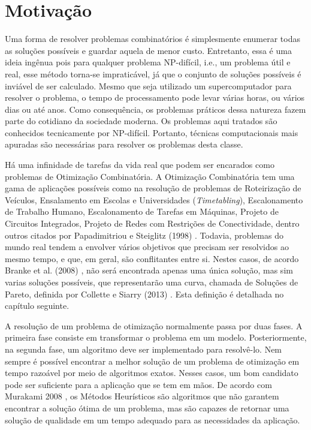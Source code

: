 \section{Motivação}
\label{sec-motivacao}

Uma forma de resolver problemas combinatórios é simplesmente enumerar todas as soluções possíveis e guardar aquela de menor custo. Entretanto, essa é uma ideia ingênua pois para qualquer problema NP-difícil, i.e., um problema útil e real, esse método torna-se impraticável, já que o conjunto de soluções possíveis é inviável de ser calculado. Mesmo que seja utilizado um supercomputador para resolver o problema, o tempo de processamento pode levar várias horas, ou vários dias ou até anos. Como consequência, os problemas práticos dessa natureza fazem parte do cotidiano da sociedade moderna. Os problemas aqui tratados são conhecidos tecnicamente por NP-difícil. Portanto, técnicas computacionais mais apuradas são necessárias para resolver os problemas desta classe.

Há uma infinidade de tarefas da vida real que podem ser encarados como problemas de Otimização Combinatória. A Otimização Combinatória tem uma gama de aplicações possíveis como na resolução de problemas de Roteirização de Veículos, Ensalamento em Escolas e Universidades (\textit{Timetabling}), Escalonamento de Trabalho Humano, Escalonamento de Tarefas em Máquinas, Projeto de Circuitos Integrados, Projeto de Redes com Restrições de Conectividade, dentro outros citados por Papadimitriou e Steiglitz (1998) \cite{papadimitriou1982combinatorial}. Todavia, problemas do mundo real tendem a envolver vários objetivos que precisam ser resolvidos ao mesmo tempo, e que, em geral, são conflitantes entre si. Nestes casos, de acordo Branke et al. (2008) \cite{branke2008multiobjective}, não será encontrada apenas uma única solução, mas sim varias soluções possíveis, que representarão uma curva, chamada de Soluções de Pareto, definida por Collette e Siarry (2013) \cite{collette2013multiobjective}. Esta definição é detalhada no capítulo seguinte. 

A resolução de um problema de otimização normalmente passa por duas fases. A primeira fase consiste em transformar o problema em um modelo. Posteriormente, na segunda fase, um algoritmo deve ser implementado para resolvê-lo. Nem sempre é possível encontrar a melhor solução de um problema de otimização em tempo razoável por meio de algoritmos exatos. Nesses casos, um bom candidato pode ser suficiente para a aplicação que se tem em mãos. De acordo com Murakami 2008 \cite{murakami2008soluccao}, os Métodos Heurísticos são algoritmos que não garantem encontrar a solução ótima de um problema, mas são capazes de retornar uma solução de qualidade em um tempo adequado para as necessidades da aplicação.

